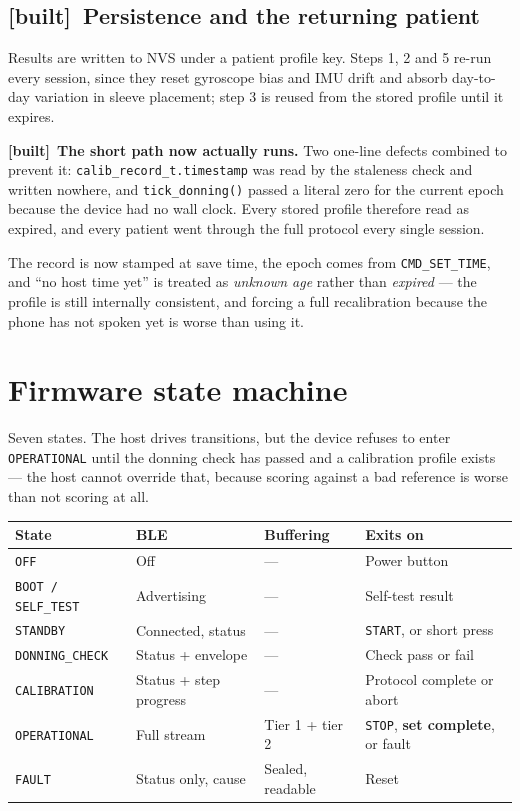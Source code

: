\documentclass[11pt]{article}
\newcommand{\built}{{\sffamily\scriptsize\color{good}\textbf{[built]}}\ }
\begin{document}
\subsection{\built Persistence and the returning patient}

Results are written to NVS under a patient profile key. Steps 1, 2 and 5
re-run every session, since they reset gyroscope bias and IMU drift and absorb
day-to-day variation in sleeve placement; step 3 is reused from the stored
profile until it expires.

\begin{callout}
\built \textbf{The short path now actually runs.} Two one-line defects
combined to prevent it: \texttt{calib\_record\_t.timestamp} was read by the
staleness check and written nowhere, and \texttt{tick\_donning()} passed a
literal zero for the current epoch because the device had no wall clock. Every
stored profile therefore read as expired, and every patient went through the
full protocol every single session.

\medskip
The record is now stamped at save time, the epoch comes from
\texttt{CMD\_SET\_TIME}, and ``no host time yet'' is treated as \emph{unknown
age} rather than \emph{expired} --- the profile is still internally
consistent, and forcing a full recalibration because the phone has not spoken
yet is worse than using it.
\end{callout}

\section{Firmware state machine}

Seven states. The host drives transitions, but the device refuses to enter
\texttt{OPERATIONAL} until the donning check has passed and a calibration
profile exists --- the host cannot override that, because scoring against a
bad reference is worse than not scoring at all.

\begin{table}[H]
\centering\small
\begin{tabularx}{\linewidth}{@{}p{26mm} p{28mm} p{18mm} X@{}}
\toprule
\textbf{State} & \textbf{BLE} & \textbf{Buffering} & \textbf{Exits on} \\
\midrule
\texttt{OFF} & Off & --- & Power button \\
\texttt{BOOT / SELF\_TEST} & Advertising & --- & Self-test result \\
\texttt{STANDBY} & Connected, status & --- & \texttt{START}, or short press \\
\texttt{DONNING\_CHECK} & Status + envelope & --- & Check pass or fail \\
\texttt{CALIBRATION} & Status + step progress & --- & Protocol complete or abort \\
\texttt{OPERATIONAL} & Full stream & Tier 1 + tier 2 & \texttt{STOP}, \textbf{set complete}, or fault \\
\texttt{FAULT} & Status only, cause & Sealed, readable & Reset \\
\bottomrule
\end{tabularx}
\end{table}
\end{document}
